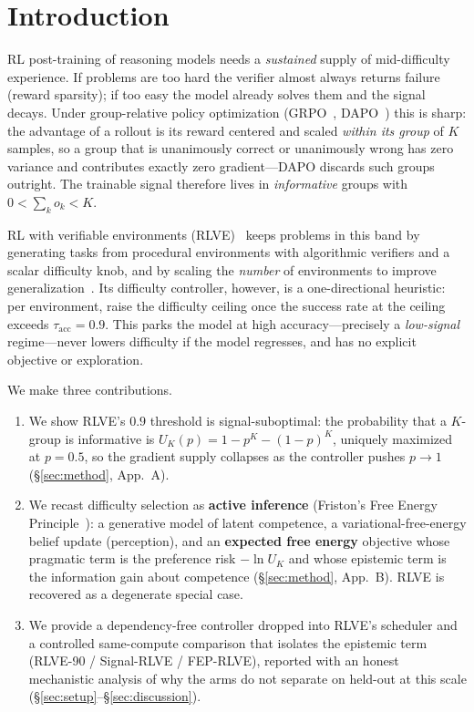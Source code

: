 \documentclass{article}
\newcommand{\UK}{U_{K}}
\begin{document}
\section{Introduction}
RL post-training of reasoning models needs a \emph{sustained} supply of
mid-difficulty experience. If problems are too hard the verifier almost always
returns failure (reward sparsity); if too easy the model already solves them and
the signal decays. Under group-relative policy optimization
(GRPO~\citep{shao2024deepseekmath}, DAPO~\citep{yu2025dapo}) this is sharp: the
advantage of a rollout is its reward centered and scaled \emph{within its group}
of $K$ samples, so a group that is unanimously correct or unanimously wrong has
zero variance and contributes exactly zero gradient---DAPO discards such groups
outright. The trainable signal therefore lives in \emph{informative} groups with
$0 < \sum_k o_k < K$.

RL with verifiable environments (RLVE)~\citep{zeng2025rlve} keeps problems in this
band by generating tasks from procedural environments with algorithmic verifiers
and a scalar difficulty knob, and by scaling the \emph{number} of environments to
improve generalization~\citep{scaler2026}. Its difficulty controller, however, is
a one-directional heuristic: per environment, raise the difficulty ceiling once
the success rate at the ceiling exceeds $\tau_{\mathrm{acc}}{=}0.9$. This parks
the model at high accuracy---precisely a \emph{low-signal} regime---never lowers
difficulty if the model regresses, and has no explicit objective or exploration.

We make three contributions.
\begin{enumerate}[leftmargin=1.4em,itemsep=1pt,topsep=1pt]
\item We show RLVE's $0.9$ threshold is signal-suboptimal: the probability that a
$K$-group is informative is $\UK(p)=1-p^K-(1-p)^K$, uniquely maximized at
$p=0.5$, so the gradient supply collapses as the controller pushes $p\!\to\!1$
(\S\ref{sec:method}, App.~A).
\item We recast difficulty selection as \textbf{active inference} (Friston's Free
Energy Principle~\citep{friston2010free,dacosta2020active}): a generative model of
latent competence, a variational-free-energy belief update (perception), and an
\textbf{expected free energy} objective whose pragmatic term is the preference
risk $-\ln \UK$ and whose epistemic term is the information gain about competence
(\S\ref{sec:method}, App.~B). RLVE is recovered as a degenerate special case.
\item We provide a dependency-free controller dropped into RLVE's scheduler and a
controlled same-compute comparison that isolates the epistemic term
(RLVE-90 / Signal-RLVE / FEP-RLVE), reported with an honest mechanistic analysis
of why the arms do not separate on held-out at this scale
(\S\ref{sec:setup}--\S\ref{sec:discussion}).
\end{enumerate}
\end{document}
